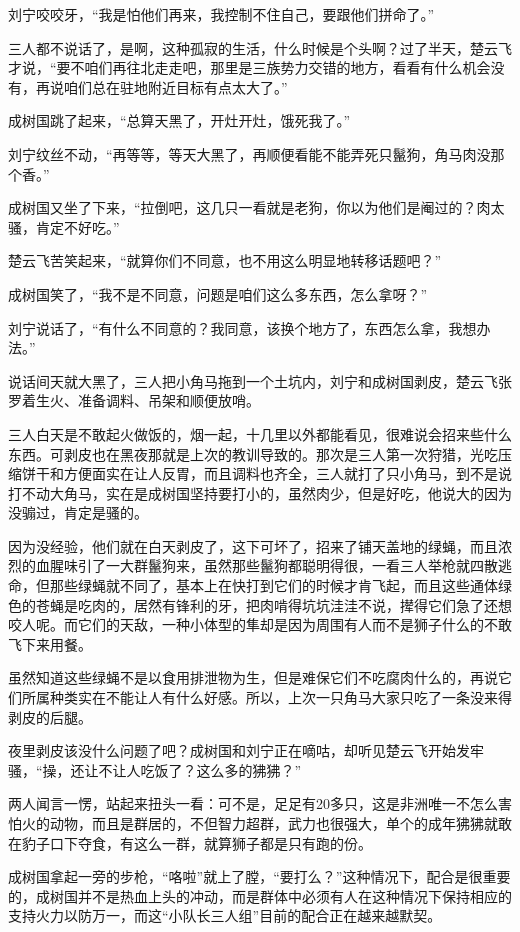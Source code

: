 刘宁咬咬牙，“我是怕他们再来，我控制不住自己，要跟他们拼命了。”

三人都不说话了，是啊，这种孤寂的生活，什么时候是个头啊？过了半天，楚云飞才说，“要不咱们再往北走走吧，那里是三族势力交错的地方，看看有什么机会没有，再说咱们总在驻地附近目标有点太大了。”

成树国跳了起来，“总算天黑了，开灶开灶，饿死我了。”

刘宁纹丝不动，“再等等，等天大黑了，再顺便看能不能弄死只鬣狗，角马肉没那个香。”

成树国又坐了下来，“拉倒吧，这几只一看就是老狗，你以为他们是阉过的？肉太骚，肯定不好吃。”

楚云飞苦笑起来，“就算你们不同意，也不用这么明显地转移话题吧？”

成树国笑了，“我不是不同意，问题是咱们这么多东西，怎么拿呀？”

刘宁说话了，“有什么不同意的？我同意，该换个地方了，东西怎么拿，我想办法。”

说话间天就大黑了，三人把小角马拖到一个土坑内，刘宁和成树国剥皮，楚云飞张罗着生火、准备调料、吊架和顺便放哨。

三人白天是不敢起火做饭的，烟一起，十几里以外都能看见，很难说会招来些什么东西。可剥皮也在黑夜那就是上次的教训导致的。那次是三人第一次狩猎，光吃压缩饼干和方便面实在让人反胃，而且调料也齐全，三人就打了只小角马，到不是说打不动大角马，实在是成树国坚持要打小的，虽然肉少，但是好吃，他说大的因为没骟过，肯定是骚的。

因为没经验，他们就在白天剥皮了，这下可坏了，招来了铺天盖地的绿蝇，而且浓烈的血腥味引了一大群鬣狗来，虽然那些鬣狗都聪明得很，一看三人举枪就四散逃命，但那些绿蝇就不同了，基本上在快打到它们的时候才肯飞起，而且这些通体绿色的苍蝇是吃肉的，居然有锋利的牙，把肉啃得坑坑洼洼不说，撵得它们急了还想咬人呢。而它们的天敌，一种小体型的隼却是因为周围有人而不是狮子什么的不敢飞下来用餐。

虽然知道这些绿蝇不是以食用排泄物为生，但是难保它们不吃腐肉什么的，再说它们所属种类实在不能让人有什么好感。所以，上次一只角马大家只吃了一条没来得剥皮的后腿。

夜里剥皮该没什么问题了吧？成树国和刘宁正在嘀咕，却听见楚云飞开始发牢骚，“操，还让不让人吃饭了？这么多的狒狒？”

两人闻言一愣，站起来扭头一看：可不是，足足有20多只，这是非洲唯一不怎么害怕火的动物，而且是群居的，不但智力超群，武力也很强大，单个的成年狒狒就敢在豹子口下夺食，有这么一群，就算狮子都是只有跑的份。

成树国拿起一旁的步枪，“咯啦”就上了膛，“要打么？”这种情况下，配合是很重要的，成树国并不是热血上头的冲动，而是群体中必须有人在这种情况下保持相应的支持火力以防万一，而这“小队长三人组”目前的配合正在越来越默契。

